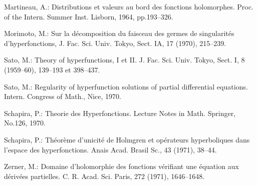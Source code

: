 \begin{thebibliography}{20}
    Martineau, A.: 
    Distributions et valeurs au bord des fonctions holomorphes. 
    Proc. of the Intern. Summer Inst. Lisborn, 1964, pp.193--326.

    Morimoto, M.: 
    Sur la d\'ecomposition du faisceau des germes 
    de singularit\'es d’hyperfonctions, 
    J. Fac. Sci. Univ. Tokyo, Sect. IA, 17 (1970), 215--239.

    Sato, M.: 
    Theory of hyperfunctions, I et II. 
    J. Fac. Sci. Univ. Tokyo, Sect. I, 8 (1959–60), 
    139--193 et 398--437.

    Sato, M.: 
    Regularity of hyperfunction solutions 
    of partial differential equations. 
    Intern. Congress of Math., Nice, 1970.

    Schapira, P.: 
    Theorie des Hyperfonctions. 
    Lecture Notes in Math. Springer, No.126, 1970.

    Schapira, P.: 
    Th\'eor\`eme d’unicit\'e de Holmgren et op\'erateurs 
    hyperboliques dans l’espace des hyperfonctions. 
    Anais Acad. Brasil Sc., 43 (1971), 38--44.

    Zerner, M.: 
    Domaine d’holomorphie des fonctions v\'erifiant 
    une \'equation aux d\'eriv\'ees partielles. 
    C. R. Acad. Sci. Paris, 272 (1971), 1646--1648.
\end{thebibliography}




